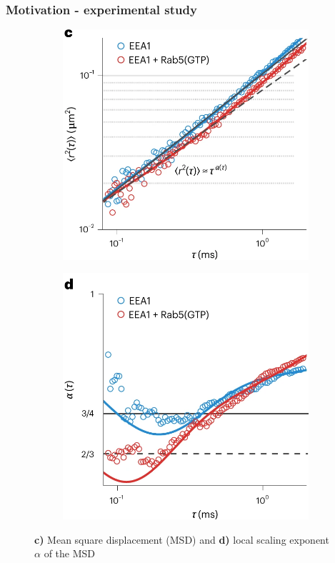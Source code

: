 \documentclass[handout]{beamer}
\begin{document}
\begin{frame}
    \frametitle{Motivation - experimental study}
    \centering
    \begin{figure}[h]
        \centering
        \begin{subfigure}[b]{0.49\textwidth}
            \centering
            \includegraphics[width=\textwidth]{./Singh_intro_с.png}
        \end{subfigure}
        \begin{subfigure}[b]{0.49\textwidth}
            \centering
            \includegraphics[width=\textwidth]{./Singh_intro_d.png}
        \end{subfigure}
        \caption{
            \textbf{c)} Mean square displacement (MSD) and \textbf{d)}
            local scaling exponent $\alpha$ of the MSD \cite{Singh:2022}
        }
    \end{figure}


\end{frame}
\end{document}
